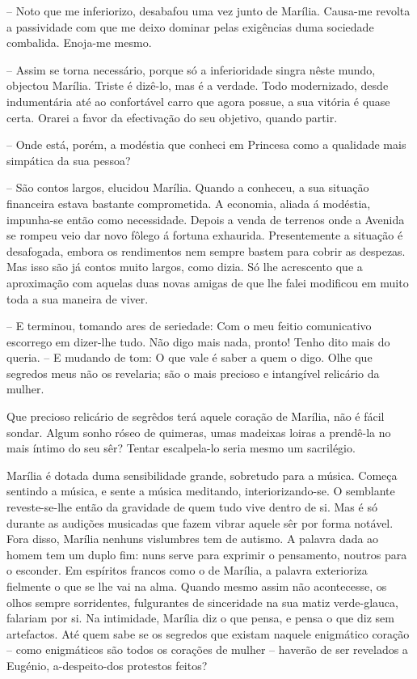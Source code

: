 \documentclass[9pt]{article}
\begin{document}
-- Noto que me inferiorizo, desabafou uma vez junto de Marília. Causa-me revolta a passividade com que me deixo dominar pelas exi\-gên\-cias duma sociedade combalida. Enoja-me mesmo.

-- Assim se torna necessário, porque só a inferioridade singra nês\-te
mundo, objectou Marília. Triste é dizê-lo, mas é a verdade. Todo modernizado,
desde indumentária até ao confortável carro que agora possue, a sua vitória
é quase certa. Orarei a favor da efectiva\-ção do seu objetivo, quan\-do
partir.

-- Onde está, porém, a modéstia que conheci em Princesa como a qualidade
mais simpática da sua pessoa?

-- São contos largos, elucidou Marília. Quando a conheceu, a sua situa\-ção
financeira estava bastante comprometida. A economia, aliada á modéstia, impunha-se então como necessidade. Depois a venda de terrenos onde a Avenida se
rompeu veio dar novo fôlego á fortuna exhaurida. Presentemente a situa\-ção
é desafogada, embora os rendimentos nem sempre bastem para cobrir as despezas.
Mas isso são já contos muito largos, como dizia. Só lhe acrescento que a
aproxima\-ção com aquelas duas novas amigas de que lhe falei modificou em
muito toda a sua maneira de viver.

-- E terminou, tomando ares de seriedade: Com o meu feitio comunicativo
escorrego em dizer-\-lhe tudo. Não digo mais nada, pronto! Tenho dito mais do
queria. -- E mudando de tom: O que vale é saber a quem o digo. O\-lhe que
segredos meus não os revelaria; são o mais precioso e intangível relicário
da mu\-lher.

Que precioso relicário de segrêdos terá aquele cora\-ção de Marília, não
é fácil sondar. Algum sonho róseo de quimeras, umas madeixas loiras a prendê-la no mais íntimo do seu sêr? Tentar escalpela-lo seria mesmo um sacrilégio.

Marília é dotada duma sensibilidade gran\-de, sobretudo para a mú\-si\-ca.
Começa sentindo a música, e sente a música meditando, interio\-rizando-se. O semblante reveste-se-\-lhe então da gravidade de quem tudo vive dentro de si. Mas
é só durante as audi\-ções musicadas que fazem vibrar aquele sêr por forma notável. Fora disso, Marília nenhuns vislumbres tem de autismo. A palavra dada
ao homem tem um duplo fim: nuns serve para exprimir o pensamento, noutros
para o esconder. Em espíritos francos como o de Marília, a palavra exterioriza fielmente o que se lhe vai na alma. Quando mesmo assim não acontecesse, os
o\-lhos sempre sorridentes, fulgurantes de sinceridade na sua matiz ver\-\mbox{de-glauca}, falariam por si. Na intimidade, Marília diz o que pensa, e pensa o que diz
 sem artefactos. Até quem sabe se os segredos que existam naquele enigmático cora\-ção -- como enigmáticos são todos os cora\-ções de mu\-lher -- haverão
de ser revelados a Eugé\-nio, a-despeito-dos protestos feitos?
\end{document}
